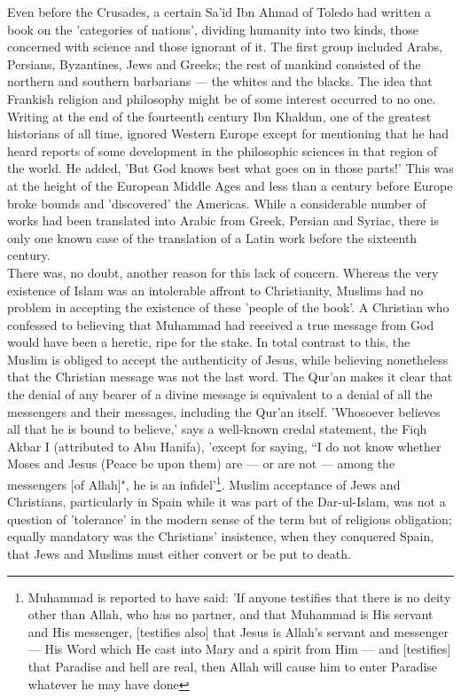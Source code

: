 \documentclass[10pt, twoside]{book}
\begin{document}
Even before the Crusades, a certain Sa'id Ibn Ahmad of Toledo had written a book on the 'categories of nations', dividing humanity into two kinds, those concerned with science and those ignorant of it. The first group included Arabs, Persians, Byzantines, Jews and Greeks; the rest of mankind consisted of the northern and southern barbarians --- the whites and the blacks. The idea that Frankish religion and philosophy might be of some interest occurred to no one. Writing at the end of the fourteenth century Ibn Khaldun, one of the greatest historians of all time, ignored Western Europe except for mentioning that he had heard reports of some development in the philosophic sciences in that region of the world. He added, 'But God knows best what goes on in those parts!' This was at the height of the European Middle Ages and less than a century before Europe broke bounds and 'discovered' the Americas. While a considerable number of works had been translated into Arabic from Greek, Persian and Syriac, there is only one known case of the translation of a Latin work before the sixteenth century. \\

There was, no doubt, another reason for this lack of concern. Whereas the very existence of Islam was an intolerable affront to Christianity, Muslims had no problem in accepting the existence of these 'people of the book'. A Christian who confessed to believing that Muhammad had received a true message from God would have been a heretic, ripe for the stake. In total contrast to this, the Muslim is obliged to accept the authenticity of Jesus, while believing nonetheless that the Christian message was not the last word. The Qur'an makes it clear that the denial of any bearer of a divine message is equivalent to a denial of all the messengers and their messages, including the Qur'an itself. 'Whosoever believes all that he is bound to believe,' says a well\hyp{}known credal statement, the Fiqh Akbar I (attributed to Abu Hanifa), 'except for saying, ``I do not know whether Moses and Jesus (Peace be upon them) are --- or are not --- among the messengers [of Allah]", he is an infidel'\footnote{Muhammad is reported to have said: 'If anyone testifies that there is no deity other than Allah, who has no partner, and that Muhammad is His servant and His messenger, [testifies also] that Jesus is Allah's servant and messenger --- His Word which He cast into Mary and a spirit from Him --- and [testifies] that Paradise and hell are real, then Allah will cause him to enter Paradise whatever he may have done}. Muslim acceptance of Jews and Christians, particularly in Spain while it was part of the Dar\hyp{}ul\hyp{}Islam, was not a question of 'tolerance' in the modern sense of the term but of religious obligation; equally mandatory was the Christians' insistence, when they conquered Spain, that Jews and Muslims must either convert or be put to death. \\
\end{document}
